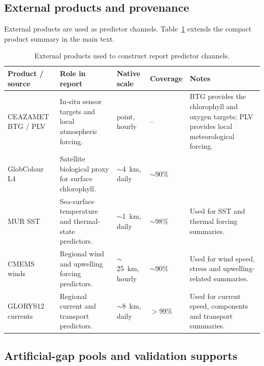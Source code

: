 \subsection{External products and provenance}
\label{app:data_products}

External products are used as predictor channels. Table~\ref{tab:appendix_products}
extends the compact product summary in the main text.

\begin{table}[h]
  \centering
  \small
  \caption{External products used to construct report predictor channels.}
  \label{tab:appendix_products}
  \begin{tabularx}{\textwidth}{@{}l X l l X@{}}
    \toprule
    Product / source & Role in report & Native scale & Coverage & Notes \\
    \midrule
    CEAZAMET BTG / PLV
    & In-situ sensor targets and local atmospheric forcing.
    & point, hourly
    & --
    & BTG provides the chlorophyll and oxygen targets; PLV provides local meteorological forcing. \\

    GlobColour L4 \chl{}
    & Satellite biological proxy for surface chlorophyll.
    & $\sim$4~km, daily
    & $\sim$90\%
    & \\

    MUR SST
    & Sea-surface temperature and thermal-state predictors.
    & $\sim$1~km, daily
    & $\sim$98\%
    & Used for SST and thermal forcing summaries. \\

    CMEMS winds
    & Regional wind and upwelling forcing predictors.
    & $\sim$25~km, hourly
    & $\sim$90\%
    & Used for wind speed, stress and upwelling-related summaries. \\

    GLORYS12 currents
    & Regional current and transport predictors.
    & $\sim$8~km, daily
    & $>99\%$
    & Used for current speed, components and transport summaries. \\
    \bottomrule
  \end{tabularx}
\end{table}

\subsection{Artificial-gap pools and validation supports}
\label{app:gap_pools}

